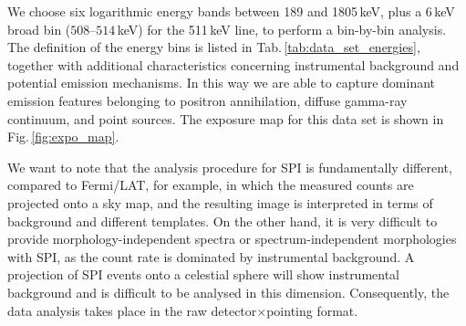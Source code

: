 \documentclass[doublespace,nopageskip]{VTthesis} %
\begin{document}
We choose six logarithmic energy bands between 189 and 1805\,keV, plus a 6\,keV broad bin ($508$--$514$\,keV) for the 511\,keV line, to perform a bin-by-bin analysis. The definition of the energy bins is listed in Tab.\,\ref{tab:data_set_energies}, together with additional characteristics concerning instrumental background and potential emission mechanisms.
%
In this way we are able to capture dominant emission features belonging to positron annihilation, diffuse gamma-ray continuum, and point sources. The exposure map for this data set is shown in Fig.\,\ref{fig:expo_map}.

%

%
%

We want to note that the analysis procedure for SPI is fundamentally different, compared to Fermi/LAT, for example, in which the measured counts are projected onto a sky map, and the resulting image is interpreted in terms of background and different templates.
%
On the other hand, it is very difficult to provide morphology-independent spectra or spectrum-independent morphologies with SPI, as the count rate is dominated by instrumental background.
%
A projection of SPI events onto a celestial sphere will show instrumental background and is difficult to be analysed in this dimension.
%
Consequently, the data analysis takes place in the raw detector$\times$pointing format.
\end{document}
